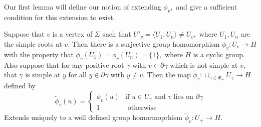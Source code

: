 \documentclass[class=book, crop=false,12 pt]{standalone}
\begin{document}
Our first lemma will define our notion of extending $\phi_v,$ and give a sufficient condition for this extension to exist.
\begin{lemma}
	Suppose that $v$ is a vertex of $\Sigma$ such that $U'_v=\langle U_1,U_n\rangle\neq U_v,$ where $U_1,U_n$ are the simple roots at $v.$ Then there is a surjective group homomorphism $\phi_v:U_v\to H$ with the property that $\phi_v(U_1)=\phi_v(U_n)=\{1\},$ where $H$ is a cyclic group. Also suppose that for any positive root $\gamma$ with $v\in \partial \gamma$ which is not simple at $v,$ that $\gamma$ is simple at $y$ for all $y\in \partial \gamma$ with $y\neq v.$ Then the map $\tilde{\phi}_v:\cup_{\gamma\in \Phi_+}U_\gamma\to H$ defined by
\[
	\tilde{\phi}_v(u)=\begin{cases} \phi_v(u)&\text{if }u\in U_\gamma\text{ and }v\text{ lies on }\partial\gamma\\
		1&\text{ otherwise}
	\end{cases}
\]
Extends uniquely to a well defined group homormoprhism $\tilde{\phi}_v:U_+\to H.$
	\label{existence}
\end{lemma}
\end{document}
